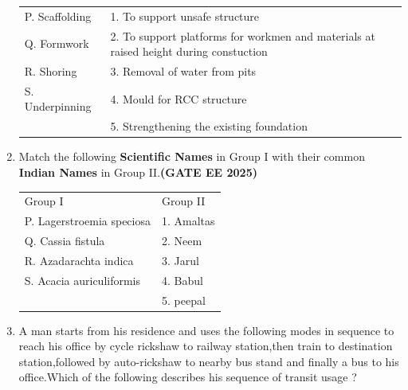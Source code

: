 \documentclass[journal,12pt,onecolumn]{IEEEtran}
\theoremstyle{remark}
\begin{document}
\begin{enumerate}
\begin{tabular}{p{}p{}}
P. Scaffolding     &1. To support unsafe structure  \\
Q. Formwork     &2. To support platforms for workmen and materials at raised height during constuction\\
R. Shoring    & 3. Removal of water from pits\\
S. Underpinning & 4. Mould for RCC structure\\
     & 5. Strengthening the existing foundation\\
\end{tabular}
\begin{enumerate}
\end{enumerate}
\item Match the following \textbf{Scientific Names} in Group I with their common \textbf{Indian Names} in Group II.\hfill \textbf{(GATE EE 2025)}
\begin{tabular}{p{}p{}}
Group I & Group II\\
P. Lagerstroemia speciosa     &1. Amaltas  \\
Q. Cassia fistula     & 2. Neem\\
R. Azadarachta indica & 3. Jarul\\
S. Acacia auriculiformis & 4. Babul\\
       & 5. peepal\\
\end{tabular}
\begin{enumerate}
\end{enumerate}
\item A man starts from his residence and uses the following modes in sequence to reach his office by cycle rickshaw to railway station,then train to destination station,followed by auto-rickshaw to nearby bus stand and finally a bus to his office.Which of the following describes his sequence of transit usage ?

\end{enumerate}
\end{document}
